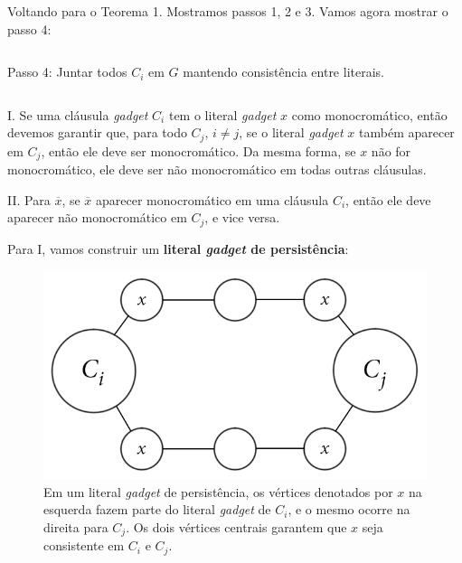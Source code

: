 \documentclass{beamer}
\newcommand{\ov}{\overline}
\theoremstyle{plain}
\newcommand{\gadget}{\textit{gadget}}
\newcommand{\bcolor}[1]{{\color{blue} #1}}
\begin{document}
\begin{frame}
  Voltando para o Teorema 1. Mostramos passos \bcolor{1}, \bcolor{2} e \bcolor{3}. Vamos agora
  mostrar o passo \bcolor{4}:

  \normalsize
  \begin{columns}[t]
    \begin{column}{0.9\textwidth}
      \begin{block}{Passo 4:}
        Juntar todos $C_i$ em $G$ mantendo consistência entre literais.
      \end{block}
    \end{column}
  \end{columns}
  \vspace{0.2in}

  \bcolor{I.} Se uma cláusula \gadget{} $C_i$ tem o literal \gadget{} $x$ como monocromático, então
  devemos garantir que, para todo $C_j$, $i\neq j$, se o literal \gadget{} $x$ também aparecer em
  $C_j$, então ele deve ser monocromático. Da mesma forma, se $x$ não for monocromático, ele deve
  ser não monocromático em todas outras cláusulas.

  \bcolor{II.} Para $\ov{x}$, se $\ov{x}$ aparecer monocromático em uma cláusula $C_i$, então ele
  deve aparecer não monocromático em $C_j$, e vice versa.
\end{frame}

\begin{frame}
  Para \bcolor{I}, vamos construir um \textbf{literal \gadget{} de persistência}:

  \begin{figure}[h]
    \centering\includegraphics[scale=0.3]{imgs/persistence.png}
    \captionsetup{justification=raggedright}
    \caption{Em um literal \gadget{} de persistência, os vértices denotados por $x$ na esquerda
    fazem parte do literal \gadget{} de $C_i$, e o mesmo ocorre na direita para $C_j$. Os dois
    vértices centrais garantem que $x$ seja consistente em $C_i$ e $C_j$.}
  \end{figure}
\end{frame}
\end{document}
